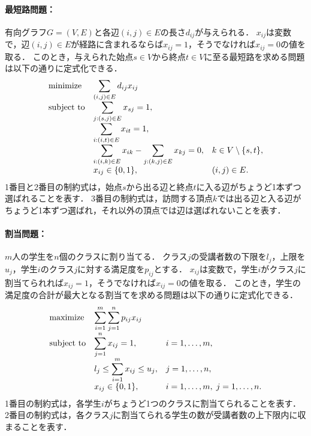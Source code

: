 \documentclass[japanese]{jnlp_1.4}
\begin{document}
\paragraph{最短路問題：}
有向グラフ$G=(V,E)$と各辺$(i,j) \in E$の長さ$d_{ij}$が与えられる．
$x_{ij}$は変数で，辺$(i,j) \in E$が経路に含まれるならば$x_{ij}=1$，そうでなければ$x_{ij}=0$の値を取る．
このとき，与えられた始点$s \in V$から終点$t \in V$に至る最短路を求める問題は以下の通りに定式化できる．
\pagebreak
\begin{equation}
\begin{array}{lll}
\textnormal{minimize} & \displaystyle\sum_{(i,j) \in E} d_{ij} x_{ij} & \\
\textnormal{subject to} & \displaystyle\sum_{j:(s,j) \in E} x_{sj} = 1, & \\
 & \displaystyle\sum_{i:(i,t) \in E} x_{it} = 1, & \\
 & \displaystyle\sum_{i:(i,k) \in E} x_{ik} - \sum_{j:(k,j) \in E} x_{kj} = 0, & k \in V \setminus \{ s, t \},\\
 & x_{ij}\in \{ 0, 1 \}, & (i,j) \in E.
\end{array}
\end{equation}
1番目と2番目の制約式は，始点$s$から出る辺と終点$t$に入る辺がちょうど1本ずつ選ばれることを表す．
3番目の制約式は，訪問する頂点$k$では出る辺と入る辺がちょうど1本ずつ選ばれ，それ以外の頂点では辺は選ばれないことを表す．


\paragraph{割当問題：}
$m$人の学生を$n$個のクラスに割り当てる．
クラス$j$の受講者数の下限を$l_j$，上限を$u_j$，学生$i$のクラス$j$に対する満足度を$p_{ij}$とする．
$x_{ij}$は変数で，学生$i$がクラス$j$に割当てられれば$x_{ij}=1$，そうでなければ$x_{ij}=0$の値を取る．
このとき，学生の満足度の合計が最大となる割当てを求める問題は以下の通りに定式化できる．
\begin{equation}
\begin{array}{lll}
\textnormal{maximize} & \displaystyle\sum_{i=1}^m \sum_{j=1}^n p_{ij} x_{ij} &\\
\textnormal{subject to} & \displaystyle\sum_{j=1}^n x_{ij} = 1, & i=1,\dots,m,\\
& \displaystyle l_j \le \sum_{i=1}^m x_{ij} \le u_j, & j=1,\dots,n,\\
 & x_{ij} \in \{ 0, 1 \}, & i=1,\dots,m, \; j=1,\dots,n.
\end{array}
\end{equation}
1番目の制約式は，各学生$i$がちょうど1つのクラスに割当てられることを表す．
2番目の制約式は，各クラス$j$に割当てられる学生の数が受講者数の上下限内に収まることを表す．
\end{document}
